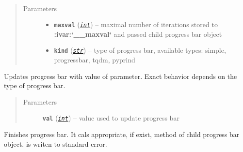 \documentclass[a4paper,10pt,english]{sphinxmanual}
\begin{document}
\begin{fulllineitems}
\begin{fulllineitems}
\label{aqueduct.utils.log:aqueduct.utils.log.pbar.__init__}~\begin{quote}\begin{description}
\item[{Parameters}] \leavevmode\begin{itemize}
\item {} 
\textbf{\texttt{maxval}} (\href{http://docs.python.org/2/library/functions.html\#int}{\emph{\texttt{int}}}) -- maximal number of iterations stored to {\color{red}\bfseries{}:ivar:{}`\_\_maxval{}`} and passed child progress bar object

\item {} 
\textbf{\texttt{kind}} (\href{http://docs.python.org/2/library/functions.html\#str}{\emph{\texttt{str}}}) -- type of progress bar, available types: simple, progressbar, tqdm, pyprind

\end{itemize}

\end{description}\end{quote}

\end{fulllineitems}


\begin{fulllineitems}
\label{aqueduct.utils.log:aqueduct.utils.log.pbar.update}
Updates progress bar with value of  parameter. Exact behavior depends
on the type of progress bar.
\begin{quote}\begin{description}
\item[{Parameters}] \leavevmode
\textbf{\texttt{val}} (\href{http://docs.python.org/2/library/functions.html\#int}{\emph{\texttt{int}}}) -- value used to update progress bar

\end{description}\end{quote}

\end{fulllineitems}


\begin{fulllineitems}
\label{aqueduct.utils.log:aqueduct.utils.log.pbar.heartbeat}
\end{fulllineitems}


\begin{fulllineitems}
\label{aqueduct.utils.log:aqueduct.utils.log.pbar.finish}
Finishes progress bar. It cals appropriate, if exist, method of child progress bar object.
is writen to standard error.

\end{fulllineitems}


\end{fulllineitems}
\end{document}

